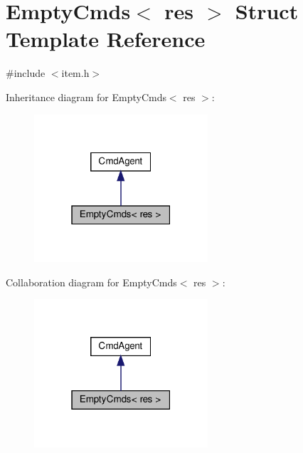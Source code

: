 \hypertarget{structEmptyCmds}{}\section{Empty\+Cmds$<$ res $>$ Struct Template Reference}
\label{structEmptyCmds}


{\ttfamily \#include $<$item.\+h$>$}



Inheritance diagram for Empty\+Cmds$<$ res $>$\+:\nopagebreak
\begin{figure}[H]
\begin{center}
\leavevmode
\includegraphics[width=183pt]{structEmptyCmds__inherit__graph}
\end{center}
\end{figure}


Collaboration diagram for Empty\+Cmds$<$ res $>$\+:\nopagebreak
\begin{figure}[H]
\begin{center}
\leavevmode
\includegraphics[width=183pt]{structEmptyCmds__coll__graph}
\end{center}
\end{figure}
